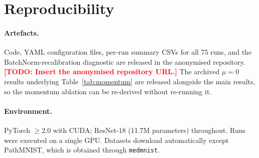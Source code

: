 \documentclass{article}
\newcommand{\todo}[1]{\textcolor{red}{\textbf{[TODO: #1]}}}
\theoremstyle{remark}
\theoremstyle{plain}
\begin{document}
\section{Reproducibility}\label{app:repro}

\paragraph{Artefacts.}
Code, YAML configuration files, per-run summary CSVs for all 75 runs, and the
BatchNorm-recalibration diagnostic are released in the anonymised repository.
\todo{Insert the anonymised repository URL.}
The archived $\mu=0$ results underlying Table~\ref{tab:momentum} are released
alongside the main results, so the momentum ablation can be re-derived without
re-running it.

\paragraph{Environment.}
PyTorch $\ge 2.0$ with CUDA; ResNet-18 (11.7M parameters) throughout. Runs were
executed on a single GPU. Datasets download automatically except PathMNIST,
which is obtained through \texttt{medmnist}.
\end{document}

